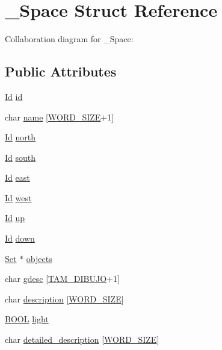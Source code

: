\hypertarget{struct__Space}{}\section{\+\_\+\+Space Struct Reference}
\label{struct__Space}


Collaboration diagram for \+\_\+\+Space\+:
\subsection*{Public Attributes}
\begin{DoxyCompactItemize}
\item 
\hyperlink{types_8h_a845e604fb28f7e3d97549da3448149d3}{Id} \hyperlink{struct__Space_a70cb461deb9ac073e401b607339b567f}{id}
\item 
char \hyperlink{struct__Space_aa1c9c994c2d16ecf3ef46138685fdfdc}{name} \mbox{[}\hyperlink{types_8h_a92ed8507d1cd2331ad09275c5c4c1c89}{W\+O\+R\+D\+\_\+\+S\+I\+ZE}+1\mbox{]}
\item 
\hyperlink{types_8h_a845e604fb28f7e3d97549da3448149d3}{Id} \hyperlink{struct__Space_ae5ebe53ce79514d7d2d93911e0159252}{north}
\item 
\hyperlink{types_8h_a845e604fb28f7e3d97549da3448149d3}{Id} \hyperlink{struct__Space_a646b68c22a0bbf1685033c96109d31d1}{south}
\item 
\hyperlink{types_8h_a845e604fb28f7e3d97549da3448149d3}{Id} \hyperlink{struct__Space_a41ce2bf33cf0c157b358221f094ee05b}{east}
\item 
\hyperlink{types_8h_a845e604fb28f7e3d97549da3448149d3}{Id} \hyperlink{struct__Space_a20c1d259e93b44e24ba82982e142eb9b}{west}
\item 
\hyperlink{types_8h_a845e604fb28f7e3d97549da3448149d3}{Id} \hyperlink{struct__Space_af2a50145d93dfb8d82b8b42138dc57a1}{up}
\item 
\hyperlink{types_8h_a845e604fb28f7e3d97549da3448149d3}{Id} \hyperlink{struct__Space_ac20194f418676bb03cca7e0fdcb6f559}{down}
\item 
\hyperlink{set_8h_a6d3b7f7c92cbb4577ef3ef7ddbf93161}{Set} $\ast$ \hyperlink{struct__Space_a661ed8b0fc8085b6db70188aa5085625}{objects}
\item 
char \hyperlink{struct__Space_af311939768f2208925e07a50ebd3f045}{gdesc} \mbox{[}\hyperlink{space_8h_a894ebc9b2098fe63607e0ca2e5f5ce8d}{T\+A\+M\+\_\+\+D\+I\+B\+U\+JO}+1\mbox{]}
\item 
char \hyperlink{struct__Space_a2a50aacb78d1d0f65f5b14f94ed81d80}{description} \mbox{[}\hyperlink{types_8h_a92ed8507d1cd2331ad09275c5c4c1c89}{W\+O\+R\+D\+\_\+\+S\+I\+ZE}\mbox{]}
\item 
\hyperlink{types_8h_a3e5b8192e7d9ffaf3542f1210aec18dd}{B\+O\+OL} \hyperlink{struct__Space_a15f20d8ccdec846b9a4f77464748bff5}{light}
\item 
char \hyperlink{struct__Space_a5b0f12b84b11444282405bb6ae64f442}{detailed\+\_\+description} \mbox{[}\hyperlink{types_8h_a92ed8507d1cd2331ad09275c5c4c1c89}{W\+O\+R\+D\+\_\+\+S\+I\+ZE}\mbox{]}
\end{DoxyCompactItemize}


